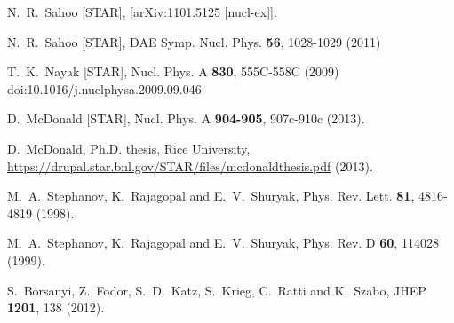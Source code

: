 \begin{thebibliography}{99}
N.~R.~Sahoo [STAR],
[arXiv:1101.5125 [nucl-ex]].

N.~R.~Sahoo [STAR],
DAE Symp. Nucl. Phys. \textbf{56}, 1028-1029 (2011)

T.~K.~Nayak [STAR],
Nucl. Phys. A \textbf{830}, 555C-558C (2009)
doi:10.1016/j.nuclphysa.2009.09.046

D.~McDonald [STAR],
Nucl. Phys. A \textbf{904-905}, 907c-910c (2013).

D.~McDonald,
Ph.D. thesis, Rice University, \href{https://drupal.star.bnl.gov/STAR/files/mcdonaldthesis.pdf}{https://drupal.star.bnl.gov/STAR/files/mcdonaldthesis.pdf} (2013).


M.~A.~Stephanov, K.~Rajagopal and E.~V.~Shuryak,
Phys. Rev. Lett. \textbf{81}, 4816-4819 (1998).

M.~A.~Stephanov, K.~Rajagopal and E.~V.~Shuryak,
Phys. Rev. D \textbf{60}, 114028 (1999).

  S.~Borsanyi, Z.~Fodor, S.~D.~Katz, S.~Krieg, C.~Ratti and K.~Szabo,
  JHEP {\bf 1201}, 138 (2012).



\end{thebibliography}

